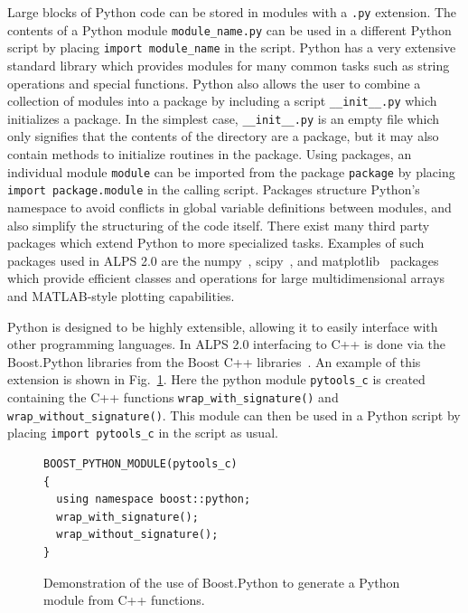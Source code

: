 \documentclass[12pt]{iopart}
\begin{document}
Large blocks of Python code can be stored in modules with a {\tt .py} extension.  The contents of a Python module {\tt module\_name.py} can be used in a different Python script by placing {\tt import module\_name} in the script.  Python has a very extensive standard library which provides modules for many common tasks such as string operations and special functions.  Python also allows the user to combine a collection of modules into a package by including a script {\tt \_\_init\_\_.py} which initializes a package.  In the simplest case, {\tt \_\_init\_\_.py} is an empty file which only signifies that the contents of the directory are a package, but it may also contain methods to initialize routines in the package.  Using packages, an individual module {\tt module} can be imported from the package {\tt package} by placing {\tt import package.module} in the calling script.  Packages structure Python's namespace to avoid conflicts in global variable definitions between modules, and also simplify the structuring of the code itself.  There exist many third party packages which extend Python to more specialized tasks.  Examples of such packages used in ALPS 2.0 are the numpy~\cite{numpy}, scipy~\cite{scipy}, and matplotlib~\cite{matplotlib} packages which provide efficient classes and operations for large multidimensional arrays and MATLAB-style plotting capabilities.  

Python is designed to be highly extensible, allowing it to easily interface with other programming languages.  In ALPS 2.0 interfacing to C++ is done via the Boost.Python libraries from the Boost C++ libraries~\cite{boost}.  An example of this extension is shown in Fig.~\ref{fig:BoostPython}.  Here the python module {\tt pytools\_c} is created containing the C++ functions {\tt wrap\_with\_signature()} and {\tt wrap\_without\_signature()}.  This module can then be used in a Python script by placing {\tt import pytools\_c} in the script as usual.
\begin{figure}[h]
\begin{tiny}
\begin{center}
\begin{verbatim}
BOOST_PYTHON_MODULE(pytools_c)
{
  using namespace boost::python;
  wrap_with_signature();
  wrap_without_signature();
}
\end{verbatim}
\end{center}
\end{tiny}
\caption{Demonstration of the use of Boost.Python to generate a Python module from C++ functions.}
\label{fig:BoostPython}
\end{figure}
\end{document}
